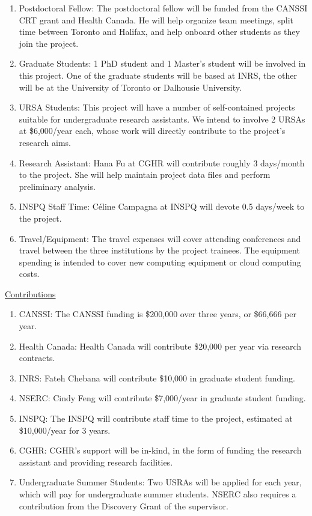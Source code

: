 \documentclass[12pt,letterpaper]{article}
\begin{document}
\begin{enumerate}
    \item Postdoctoral Fellow: The postdoctoral fellow will be funded from the CANSSI CRT grant and Health Canada. He will help organize team meetings, split time between Toronto and Halifax, and help onboard other students as they join the project. 
    
    \item Graduate Students: 1 PhD student and 1 Master's student will be involved in this project. One of the graduate students will be based at INRS, the other will be at the University of Toronto or Dalhousie University.  

    \item URSA Students: This project will have a number of self-contained projects suitable for undergraduate research assistants. We intend to involve 2 URSAs at \$6,000/year each, whose work will directly contribute to the project's research aims.
    
    \item Research Assistant: Hana Fu at CGHR will contribute roughly 3 days/month to the project. She will help maintain project data files and perform preliminary analysis. 
    
    \item INSPQ Staff Time: Céline Campagna at INSPQ will devote 0.5 days/week to the project. 
    
    \item Travel/Equipment: The travel expenses will cover attending conferences and travel between the three institutions by the project trainees. The equipment spending is intended to cover new computing equipment or cloud computing costs. 
\end{enumerate}

\underline{Contributions}

\begin{enumerate}
    \item CANSSI: The CANSSI funding is \$200,000 over three years, or \$66,666 per year. 
    
    \item Health Canada: Health Canada will contribute \$20,000 per year via research contracts. 
    
    \item INRS: Fateh Chebana will contribute \$10,000 in graduate student funding.
    
    \item NSERC: Cindy Feng will contribute \$7,000/year in graduate student funding. 
    
    \item INSPQ: The INSPQ will contribute staff time to the project, estimated at \$10,000/year for 3 years.
    
    \item CGHR: CGHR's support will be in-kind, in the form of funding the research assistant and providing research facilities.
    
    \item Undergraduate Summer Students: Two USRAs will be applied for each year, which will pay for undergraduate summer students. NSERC also requires a contribution from the Discovery Grant of the supervisor. 
\end{enumerate}
\end{document}
